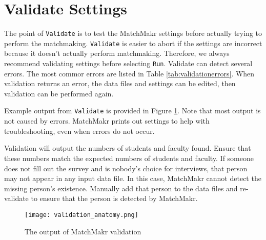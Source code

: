 %
%
\section{Validate Settings}

The point of \texttt{Validate} is to test the MatchMakr settings before actually trying to perform the matchmaking.  \texttt{Validate} is easier to abort if the settings are incorrect because it doesn't actually perform matchmaking.  Therefore, we always recommend validating settings before selecting \texttt{Run}.  Validate can detect several errors.  The most commor errors are listed in Table \ref{tab:validationerrors}.  When validation returns an error, the data files and settings can be edited, then validation can be performed again.

Example output from \texttt{Validate} is provided in Figure \ref{fig:validationanatomy}.  Note that most output is not caused by errors.  MatchMakr prints out settings to help with troubleshooting, even when errors do not occur.

Validation will output the numbers of students and faculty found.  Ensure that these numbers match the expected numbers of students and faculty.  If someone does not fill out the survey and is nobody's choice for interviews, that person may not appear in any input data file.  In this case, MatchMakr cannot detect the missing person's existence.  Manually add that person to the data  files and re-validate to ensure that the person is detected by MatchMakr.


%
%
\begin{figure}
	\centering
	\texttt{[image: validation\_anatomy.png]}
	\caption{\label{fig:validationanatomy} The output of MatchMakr validation}
\end{figure}



